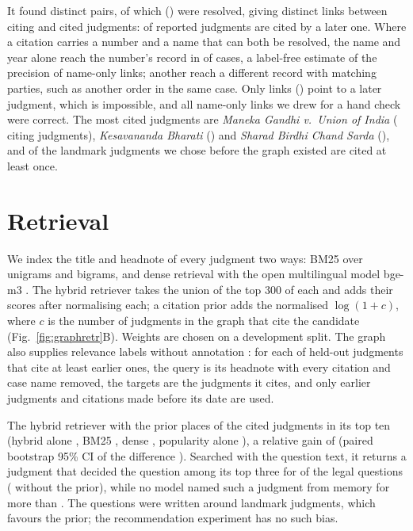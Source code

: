 It found \GraphUnits{} distinct pairs, of which \GraphResolved{} (\GraphResolvedPct) were resolved, giving \GraphEdges{} distinct links between \GraphCiting{} citing and \GraphCited{} cited judgments: \GraphCitedPct{} of reported judgments are cited by a later one. Where a citation carries a number and a name that can both be resolved, the name and year alone reach the number's record in \GraphNameSamePct{} of \GraphNamePrecN{} cases, a label-free estimate of the precision of name-only links; another \GraphNameLoosePct{} reach a different record with matching parties, such as another order in the same case. Only \GraphLater{} links (\GraphLaterPct) point to a later judgment, which is impossible, and all \GraphCheckN{} name-only links we drew for a hand check were correct. The most cited judgments are \emph{Maneka Gandhi v.\ Union of India} (\GraphTopOneN{} citing judgments), \emph{Kesavananda Bharati} (\GraphTopTwoN) and \emph{Sharad Birdhi Chand Sarda} (\GraphTopThreeN), and \GraphLandmarkCited{} of the \GraphLandmarkN{} landmark judgments we chose before the graph existed are cited at least once.

\section{Retrieval}
\label{sec:retrieval}
We index the title and headnote of every judgment two ways: BM25 \cite{robertson2009} over unigrams and bigrams, and dense retrieval with the open multilingual model bge-m3 \cite{chen2024m3}. The hybrid retriever takes the union of the top 300 of each and adds their scores after normalising each; a citation prior adds the normalised $\log(1+c)$, where $c$ is the number of judgments in the graph that cite the candidate (Fig.~\ref{fig:graphretr}B). Weights are chosen on a development split. The graph also supplies relevance labels without annotation \cite{farber2020,joshi2023ucreat}: for each of \RecNTest{} held-out judgments that cite at least \RecMinTargets{} earlier ones, the query is its headnote with every citation and case name removed, the targets are the judgments it cites, and only earlier judgments and citations made before its date are used.

The hybrid retriever with the prior places \RecHybridPriorRTenPct{} of the cited judgments in its top ten (hybrid alone \RecHybridRTen, BM25 \RecBmRTen, dense \RecDenseRTen, popularity alone \RecPopRTen), a relative gain of \RecPriorRelGain{} (paired bootstrap 95\% CI of the difference \RecDiffPriorCI). Searched with the question text, it returns a judgment that decided the question among its top three for \QHybridPriorHitThree{} of the \NumTopics{} legal questions (\QHybridHitThree{} without the prior), while no model named such a judgment from memory for more than \RefClosedLlama. The questions were written around landmark judgments, which favours the prior; the recommendation experiment has no such bias.


